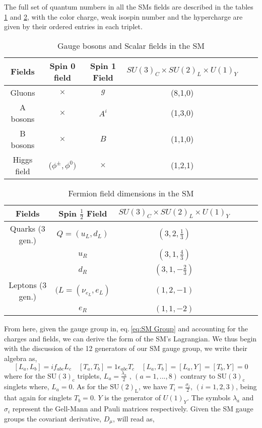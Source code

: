 The full set of quantum numbers in all the SMs fields are described in the tables \ref{table1} and \ref{table2}, with the color charge, weak isospin number and the hypercharge are given by their ordered entries in each triplet.
%
\begin{table}[H]
\centering
\caption{Gauge bosons and Scalar fields in the SM}
\label{table1}
\begin{tabular}{@{}cccccc@{}}
  \hline	
 Fields & Spin 0 field & Spin 1 Field & $SU(3)_C \times SU(2)_L \times U(1)_Y$  \\
  \hline	
 Gluons  & $\times$  & $g$ & (8,1,0) \\	
A bosons & $\times$  & $A^i$ & (1,3,0)   \\
B bosons & $\times$  & $B$ & (1,1,0)   \\
Higgs field & ($\phi^\pm, \phi^0 )$  & $\times$ & (1,2,1) \\ \hline
\end{tabular}
\end{table}
\begin{table}[H]
\centering
\caption{Fermion field dimensions in the SM}
\label{table2}
\begin{tabular}{@{}cccccc@{}}
  \hline	
 Fields & Spin $\frac{1}{2}$ Field & $SU(3)_C \times SU(2)_L \times U(1)_Y$  \\
  \hline	
Quarks (3 gen.) & $Q=(u_L,d_L)$ & $(3,2,\frac{1}{3})$ \\	
$\quad$        & $u_R$ & $(3,1,\frac{4}{3})$   \\
$\quad$   & $d_R$ & $(3,1, -\frac{2}{3})$   \\
Leptons (3 gen.) & $(L=(\nu_{e_L}, e_L )$ & $(1,2,-1)$  \\
$\quad$   & $e_R$ & $(1,1,-2)   $ \\ \hline

\end{tabular}
\end{table}
%
From here, given the gauge group in, eq.\,\ref{eq:SM Group} and accounting for the charges and fields, we can derive the form of the SM's Lagrangian. We thus begin with the discussion of the 12 generators of our SM gauge group, we write their algebra as, 
% 
\begin{equation}
\left[ L_a , L_b \right] = i f_{abc} L_c \quad \left[ T_a , T_b \right] = 1 \epsilon_{abc} T_c \quad \left[ L_a , T_b \right] = \left[ L_a , Y \right] = \left[ T_b,Y \right] = 0 
\end{equation}
%
where for the $\mathrm{SU(3)_c}$ triplets, $L_a= \frac{\lambda_a}{2}$ , $(a = 1, . . . , 8)$ {\color{gray} contrary to $\mathrm{SU(3)_c}$ singlets where, $L_a = 0$}.  As for the $\mathrm{SU(2)_L}$, we have $T_i= \frac{\sigma_i}{2} $, $(i = 1, 2, 3)$, {\color{gray} being that again for singlets $T_b=0$}. $Y$ is the generator of $U(1)_Y$. The symbols $\lambda_a$ and $\sigma_i$ represent the Gell-Mann and Pauli matrices respectively. Given the SM gauge groups the covariant derivative, $D_\mu$, will read as, 
